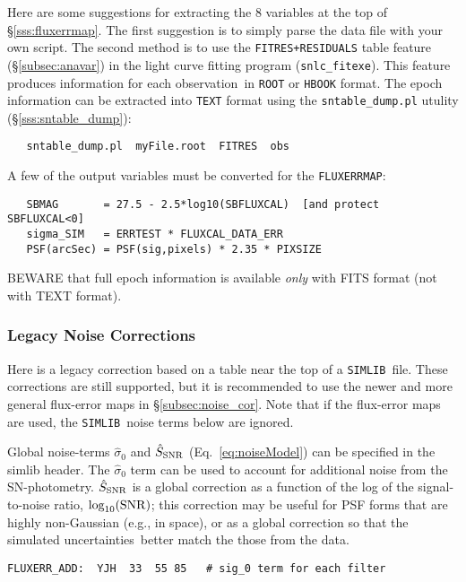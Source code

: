 \documentclass[12pt]{article}
\newcommand{\uncs}{uncertainties}
\newcommand{\simlib}{{\tt SIMLIB}}
\newcommand{\obs}{observation}
\newcommand{\sigOFF}{\hat\sigma_0}
\newcommand{\SSNR}{\hat{S}_{\rm SNR}}
\newcommand{\logSNR}{\log_{10}({\rm SNR})}
\begin{document}
{Here are some suggestions for extracting the 8 variables
at the top of \S\ref{sss:fluxerrmap}. The first suggestion
is to simply parse the data file with your own script.
The second method is to use the {\tt FITRES+RESIDUALS} table
feature (\S\ref{subsec:anavar}) 
in the light curve fitting program ({\tt snlc\_fitexe}).
This feature produces information
for each \obs\ in {\tt ROOT} or {\tt HBOOK} format.
The epoch information can be extracted into {\tt TEXT} format
using the {\tt sntable\_dump.pl} utulity (\S\ref{sss:sntable_dump}):
\begin{verbatim}
   sntable_dump.pl  myFile.root  FITRES  obs
\end{verbatim}
A few of the output variables must be converted for the
{\tt FLUXERRMAP}:
%
\begin{verbatim}
   SBMAG       = 27.5 - 2.5*log10(SBFLUXCAL)  [and protect SBFLUXCAL<0]
   sigma_SIM   = ERRTEST * FLUXCAL_DATA_ERR
   PSF(arcSec) = PSF(sig,pixels) * 2.35 * PIXSIZE
\end{verbatim}
%
BEWARE that full epoch information is available {\it only}
with FITS format (not with TEXT format).

\clearpage
\subsubsection{ Legacy Noise Corrections }
\label{sss:noise_cor_legacy}

Here is a legacy correction based on a table near the top
of a \simlib\ file. These corrections are still supported,
but it is recommended to use the newer and more general
flux-error maps in \S\ref{subsec:noise_cor}.
Note that if the flux-error maps are used, the \simlib\ noise
terms below are ignored.

Global noise-terms $\sigOFF$ and $\SSNR$ (Eq.~\ref{eq:noiseModel})
can be specified in the simlib header.
The $\sigOFF$ term can be used to account for
additional noise from the SN-photometry.
$\SSNR$ is a global correction as a function of
the log of the signal-to-noise ratio, $\logSNR$;
this correction may be useful for PSF forms
that are highly non-Gaussian (e.g., in space),
or as a global correction so that the simulated
\uncs\ better match the those from the data.

%
\begin{Verbatim}[frame=single]
FLUXERR_ADD:  YJH  33  55 85   # sig_0 term for each filter


\end{Verbatim}}
\end{document}
